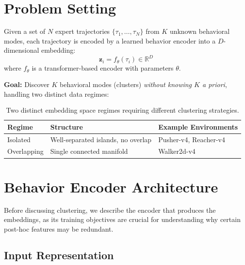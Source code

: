 \documentclass[11pt,a4paper]{article}
\newcommand{\vect}[1]{\mathbf{#1}}
\newcommand{\R}{\mathbb{R}}
\begin{document}
\section{Problem Setting}

Given a set of $N$ expert trajectories $\{\tau_1, \ldots, \tau_N\}$ from $K$ unknown behavioral modes, each trajectory is encoded by a learned behavior encoder into a $D$-dimensional embedding:
\begin{equation}
    \vect{z}_i = f_\theta(\tau_i) \in \R^D
\end{equation}
where $f_\theta$ is a transformer-based encoder with parameters $\theta$.

\textbf{Goal:} Discover $K$ behavioral modes (clusters) \textit{without knowing $K$ a priori}, handling two distinct data regimes:

\begin{table}[h]
\centering
\begin{tabular}{@{}lll@{}}
\toprule
\textbf{Regime} & \textbf{Structure} & \textbf{Example Environments} \\
\midrule
Isolated & Well-separated islands, no overlap & Pusher-v4, Reacher-v4 \\
Overlapping & Single connected manifold & Walker2d-v4 \\
\bottomrule
\end{tabular}
\caption{Two distinct embedding space regimes requiring different clustering strategies.}
\end{table}

\section{Behavior Encoder Architecture}

Before discussing clustering, we describe the encoder that produces the embeddings, as its training objectives are crucial for understanding why certain post-hoc features may be redundant.

\subsection{Input Representation}
\end{document}

